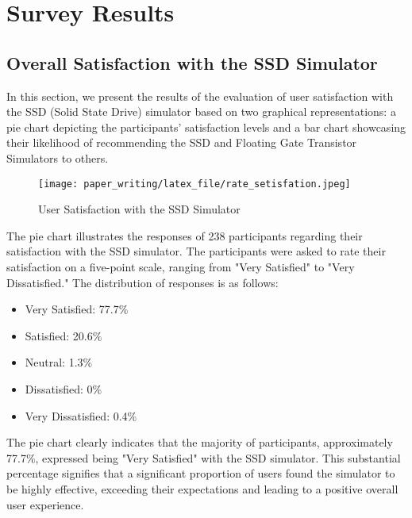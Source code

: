 \documentclass[conference]{paper_writing/latex_file/IEEEtran}
\begin{document}
\section{Survey Results}
\subsection{Overall Satisfaction with the SSD Simulator}
In this section, we present the results of the evaluation of user satisfaction with the SSD (Solid State Drive) simulator based on two graphical representations: a pie chart depicting the participants' satisfaction levels and a bar chart showcasing their likelihood of recommending the SSD and Floating Gate Transistor Simulators to others.
\begin{figure}[h]
    \centering
    \texttt{[image: paper\_writing/latex\_file/rate\_setisfation.jpeg]}
    \caption{User Satisfaction with the SSD Simulator}
    \label{fig:enter-label}
\end{figure}
The pie chart illustrates the responses of 238 participants regarding their satisfaction with the SSD simulator. The participants were asked to rate their satisfaction on a five-point scale, ranging from "Very Satisfied" to "Very Dissatisfied." The distribution of responses is as follows:
\begin{itemize}
    \item Very Satisfied: 77.7\%
    \item Satisfied: 20.6\%
    \item Neutral: 1.3\%
    \item Dissatisfied: 0\%
    \item Very Dissatisfied: 0.4\%
\end{itemize}
The pie chart clearly indicates that the majority of participants, approximately 77.7\%, expressed being "Very Satisfied" with the SSD simulator. This substantial percentage signifies that a significant proportion of users found the simulator to be highly effective, exceeding their expectations and leading to a positive overall user experience.
\end{document}

